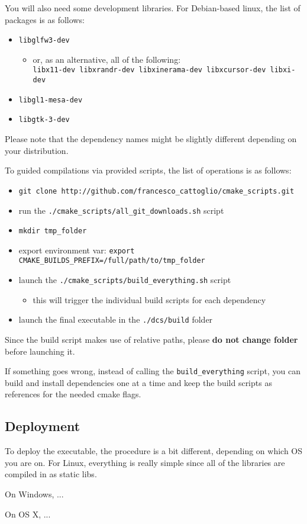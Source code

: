 You will also need some development libraries. For Debian-based linux, the list of packages is as follows:
\begin{itemize}
    \item \texttt{libglfw3-dev}
    \begin{itemize}
        \item  or, as an alternative, all of the following: \\
            \verb|libx11-dev libxrandr-dev libxinerama-dev libxcursor-dev libxi-dev|
    \end{itemize}
    \item \texttt{libgl1-mesa-dev}
    \item \texttt{libgtk-3-dev}
\end{itemize}
Please note that the dependency names might be slightly different depending on your distribution.

To guided compilations via provided scripts, the list of operations is as follows:
\begin{itemize}
    \item \texttt{git clone http://github.com/francesco\_cattoglio/cmake\_scripts.git}
    \item run the \texttt{./cmake\_scripts/all\_git\_downloads.sh} script
    \item \texttt{mkdir tmp\_folder}
    \item export environment var: \texttt{export CMAKE\_BUILDS\_PREFIX=/full/path/to/tmp\_folder}
    \item launch the \texttt{./cmake\_scripts/build\_everything.sh} script
    \begin{itemize}
        \item this will trigger the individual build scripts for each dependency
    \end{itemize}
    \item launch the final executable in the \texttt{./dcs/build} folder
\end{itemize}
Since the build script makes use of relative paths, please \textbf{do not change folder} before launching it.

If something goes wrong, instead of calling the \texttt{build\_everything} script,
you can build and install dependencies one at a time and keep the build
scripts as references for the needed cmake flags.

\subsection{Deployment}
To deploy the executable, the procedure is a bit different, depending
on which OS you are on. For Linux, everything is really simple since
all of the libraries are compiled in as static libs.

On Windows, ...

On OS X, ...
